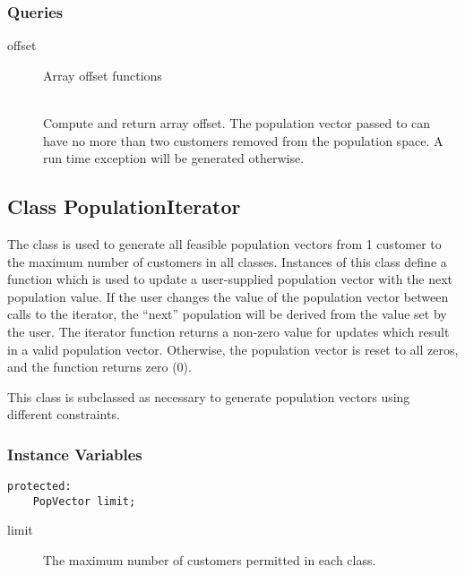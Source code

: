 \subsubsection{Queries}

\begin{description}
\item[offset] \texonly{---} Array offset functions\\
  \\

  Compute and return array offset.  The population vector passed to
   can have no more than two customers removed from the
  population space.  A run time exception will be generated otherwise.

\end{description}

\subsection{Class PopulationIterator}
\label{sec:popiter}

The  class is used to generate all feasible
population vectors from 1 customer to the maximum number of customers
in all classes.  Instances of this class define a function which is
used to update a user-supplied population vector with the next
population value.  If the user changes the value of the population
vector between calls to the iterator, the ``next'' population will be
derived from the value set by the user.  The iterator function returns
a non-zero value for updates which result in a valid population
vector.  Otherwise, the population vector is reset to all zeros, and
the function returns zero (0).

This class is subclassed as necessary to generate population vectors
using different constraints.

\subsubsection{Instance Variables}
\label{sec:popiter-ivars}
\begin{verbatim}
protected:
    PopVector limit;
\end{verbatim}

\begin{description}
\item[limit] \texonly{---} The maximum number of customers permitted
  in each class.
\end{description}

